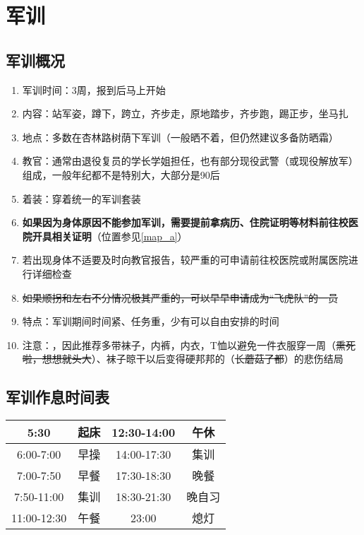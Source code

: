 \chapter[军训]{军训}

\section[军训概况]{军训概况}
\begin{enumerate}
    \item 军训时间：3周，报到后马上开始
    \item 内容\footnotemark：站军姿，蹲下，跨立，齐步走，原地踏步，齐步跑，踢正步，坐马扎
    \item 地点：多数在杏林路树荫下军训（一般晒不着，但仍然建议多备防晒霜）
    \item 教官：通常由退役复员的学长学姐担任，也有部分现役武警（或现役解放军）组成，一般年纪都不是特别大，大部分是90后
    \item 着装：穿着统一的军训套装\footnotemark
    \item \textbf{如果因为身体原因不能参加军训，需要提前拿病历、住院证明等材料前往校医院开具相关证明\label{exercise_unattend}}（位置参见\uline{\ref{map_a}}）
    \item 若出现身体不适要及时向教官报告，较严重的可申请前往校医院或附属医院进行详细检查
    \item \sout{如果顺拐和左右不分情况极其严重的，可以早早申请成为“飞虎队”\footnotemark 的一员}
    \item 特点：军训期间时间紧、任务重，少有可以自由安排的时间
    \item 注意：\textbf{}，因此推荐多带袜子，内裤，内衣，T恤以避免一件衣服穿一周（\sout{熏死啦，想想就头大}）、袜子晾干以后变得硬邦邦的（\sout{长蘑菇了都}）的悲伤结局
\end{enumerate}

\section[军训作息时间表]{军训作息时间表\footnotemark}
\begin{table}[H]
    \centering
    \begin{tabular}{|c|c|c|c|}
        \hline
        5:30        & 起床 & 12:30-14:00 & 午休  \\
        \hline
        6:00-7:00   & 早操 & 14:00-17:30 & 集训  \\
        \hline
        7:00-7:50   & 早餐 & 17:30-18:30 & 晚餐  \\
        \hline
        7:50-11:00  & 集训 & 18:30-21:30 & 晚自习 \\
        \hline
        11:00-12:30 & 午餐 & 23:00       & 熄灯  \\
        \hline
    \end{tabular}
\end{table}
